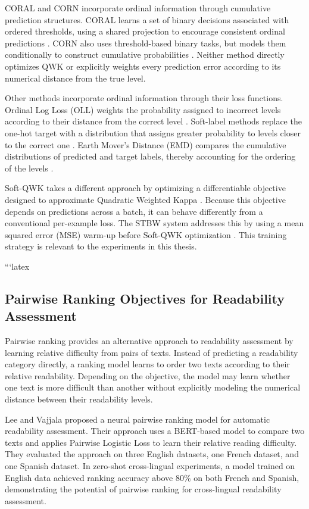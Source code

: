 \documentclass[12pt]{report}
\begin{document}
CORAL and CORN incorporate ordinal information through cumulative prediction structures. CORAL learns a set of binary decisions associated with ordered thresholds, using a shared projection to encourage consistent ordinal predictions \cite{cao2020coral}. CORN also uses threshold-based binary tasks, but models them conditionally to construct cumulative probabilities \cite{shi2023deep}. Neither method directly optimizes QWK or explicitly weights every prediction error according to its numerical distance from the true level.

Other methods incorporate ordinal information through their loss functions. Ordinal Log Loss (OLL) weights the probability assigned to incorrect levels according to their distance from the correct level \cite{castagnos2022ordinal}. Soft-label methods replace the one-hot target with a distribution that assigns greater probability to levels closer to the correct one \cite{bertinetto2020soft}. Earth Mover's Distance (EMD) compares the cumulative distributions of predicted and target labels, thereby accounting for the ordering of the levels \cite{hou2017emd}.

Soft-QWK takes a different approach by optimizing a differentiable objective designed to approximate Quadratic Weighted Kappa \cite{delatorre2018wkl,diaz2019softlabels}. Because this objective depends on predictions across a batch, it can behave differently from a conventional per-example loss. The STBW system addresses this by using a mean squared error (MSE) warm-up before Soft-QWK optimization \cite{trigui2025stbw}. This training strategy is relevant to the experiments in this thesis.

```latex
\subsection{Pairwise Ranking Objectives for Readability Assessment}
\label{subsec:pairwise_ranking}

Pairwise ranking provides an alternative approach to readability assessment by learning relative difficulty from pairs of texts. Instead of predicting a readability category directly, a ranking model learns to order two texts according to their relative readability. Depending on the objective, the model may learn whether one text is more difficult than another without explicitly modeling the numerical distance between their readability levels.

Lee and Vajjala \cite{lee2022neural} proposed a neural pairwise ranking model for automatic readability assessment. Their approach uses a BERT-based model to compare two texts and applies Pairwise Logistic Loss to learn their relative reading difficulty. They evaluated the approach on three English datasets, one French dataset, and one Spanish dataset. In zero-shot cross-lingual experiments, a model trained on English data achieved ranking accuracy above 80\% on both French and Spanish, demonstrating the potential of pairwise ranking for cross-lingual readability assessment.
\end{document}
